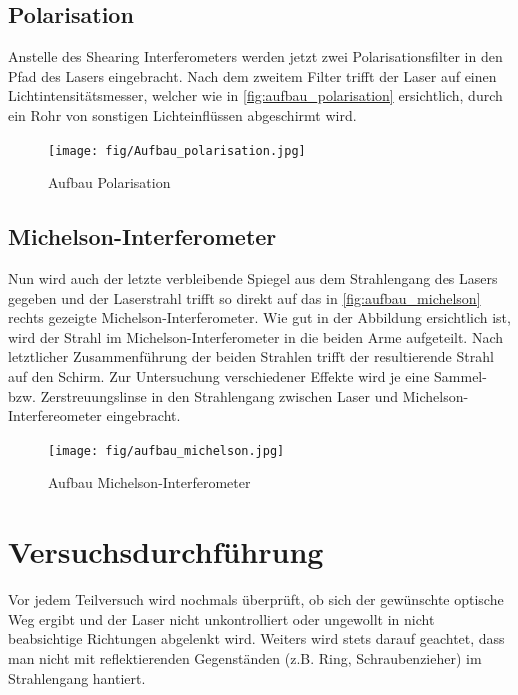 \documentclass[ngerman]{scrartcl}
\begin{document}
\subsection{Polarisation}
\label{sec:aufbau_polarisation}

Anstelle des Shearing Interferometers werden jetzt zwei Polarisationsfilter in den Pfad des Lasers eingebracht. Nach dem zweitem Filter trifft der Laser auf einen Lichtintensitätsmesser, welcher wie in \autoref{fig:aufbau_polarisation} ersichtlich, durch ein Rohr von sonstigen Lichteinflüssen abgeschirmt wird.
%
\begin{figure}[H]
    \centering
    \begin{samepage}
        \texttt{[image: fig/Aufbau\_polarisation.jpg]}
        \caption{Aufbau Polarisation}
        \label{fig:aufbau_polarisation}
    \end{samepage}
\end{figure}


\subsection{Michelson-Interferometer}
\label{sec:aufbau_michelson}

Nun wird auch der letzte verbleibende Spiegel aus dem Strahlengang des Lasers gegeben und der Laserstrahl trifft so direkt auf das in \autoref{fig:aufbau_michelson} rechts gezeigte Michelson-Interferometer. Wie gut in der Abbildung ersichtlich ist, wird der Strahl im Michelson-Interferometer in die beiden Arme aufgeteilt. Nach letztlicher Zusammenführung der beiden Strahlen trifft der resultierende Strahl auf den Schirm.
Zur Untersuchung verschiedener Effekte wird je eine Sammel- bzw. Zerstreuungslinse in den Strahlengang zwischen Laser und Michelson-Interfereometer eingebracht.
%
\begin{figure}[H]
    \centering
    \begin{samepage}
        \texttt{[image: fig/aufbau\_michelson.jpg]}
        \caption{Aufbau Michelson-Interferometer}
        \label{fig:aufbau_michelson}
    \end{samepage}
\end{figure}



\section{Versuchsdurchführung}
\label{sec:durchfuehrung}

Vor jedem Teilversuch wird nochmals überprüft, ob sich der gewünschte optische Weg ergibt und der Laser nicht unkontrolliert oder ungewollt in nicht beabsichtige Richtungen abgelenkt wird. Weiters wird stets darauf geachtet, dass man nicht mit reflektierenden Gegenständen (z.B. Ring, Schraubenzieher) im Strahlengang hantiert.
\end{document}
